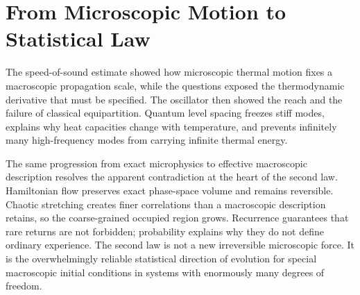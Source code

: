 \begin{classroomqa}
\end{classroomqa}

\begin{classroomqa}
\end{classroomqa}

\begin{classroomqa}
\end{classroomqa}

\section{From Microscopic Motion to Statistical Law}

The speed-of-sound estimate showed how microscopic thermal motion fixes a
macroscopic propagation scale, while the questions exposed the
thermodynamic derivative that must be specified.  The oscillator then showed
the reach and the failure of classical equipartition.  Quantum level spacing
freezes stiff modes, explains why heat capacities change with temperature,
and prevents infinitely many high-frequency modes from carrying infinite
thermal energy.

The same progression from exact microphysics to effective macroscopic
description resolves the apparent contradiction at the heart of the second
law.  Hamiltonian flow preserves exact phase-space volume and remains
reversible.  Chaotic stretching creates finer correlations than a
macroscopic description retains, so the coarse-grained occupied region
grows.  Recurrence guarantees that rare returns are not forbidden; probability
explains why they do not define ordinary experience.  The second law is not a
new irreversible microscopic force.  It is the overwhelmingly reliable
statistical direction of evolution for special macroscopic initial
conditions in systems with enormously many degrees of freedom.
